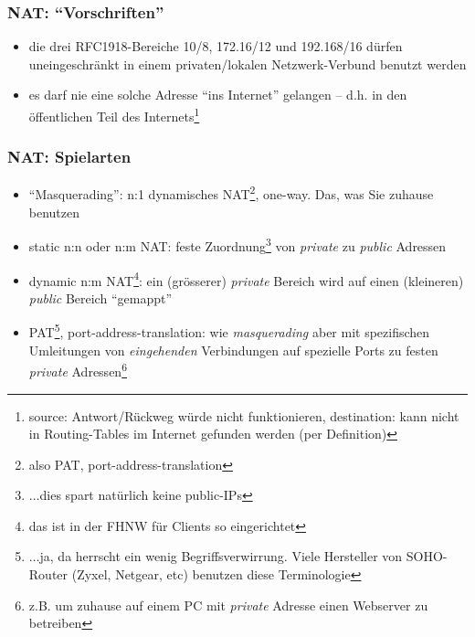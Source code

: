 \documentclass[ignorenonframetext]{beamer}
\begin{document}
\begin{frame}
\frametitle{NAT: ``Vorschriften''}
\begin{itemize}
	\item die drei RFC1918-Bereiche 10/8, 172.16/12 und 192.168/16 d\"urfen uneingeschr\"ankt in einem privaten/lokalen Netzwerk-Verbund benutzt werden
	\item es darf nie eine solche Adresse ``ins Internet'' gelangen -- d.h. in den 
	\"offentlichen Teil des Internets\footnote{source: Antwort/R\"uckweg w\"urde nicht funktionieren, destination: kann nicht in Routing-Tables im Internet gefunden werden (per Definition)}
\end{itemize}
\end{frame}



\begin{frame}
\frametitle{NAT: Spielarten}
\begin{itemize}
	\item{``Masquerading'': n:1 dynamisches NAT\footnote{also PAT, port-address-translation}, one-way. Das, was Sie zuhause benutzen}
	\item{static n:n oder n:m NAT: feste Zuordnung\footnote{$\ldots$dies spart nat\"urlich keine public-IPs} von {\em private} zu {\em public} Adressen}
	\item{dynamic n:m NAT\footnote{das ist in der FHNW f\"ur Clients so eingerichtet}: ein (gr\"osserer) {\em private} Bereich wird auf einen (kleineren) {\em public} Bereich ``gemappt''}
	\item{PAT\footnote{$\ldots$ja, da herrscht ein wenig Begriffsverwirrung. Viele Hersteller von SOHO-Router (Zyxel, Netgear, etc) benutzen diese Terminologie}, port-address-translation: wie {\em masquerading} aber mit spezifischen Umleitungen von {\em eingehenden} Verbindungen auf spezielle Ports zu festen {\em private} Adressen\footnote{z.B. um zuhause auf einem PC mit {\em private} Adresse einen Webserver zu betreiben}}
\end{itemize}
\end{frame}
\end{document}
